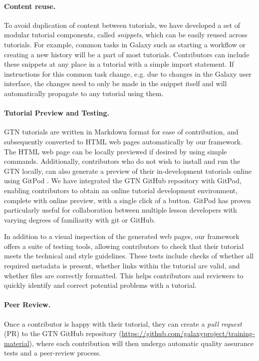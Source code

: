 \paragraph*{Content reuse.}
To avoid duplication of content between tutorials, we have developed a set of modular tutorial components, called \emph{snippets}, which can be easily reused across tutorials.
For example, common tasks in Galaxy such as starting a workflow or creating a new history will be a part of most tutorials. Contributors can include these snippets at any place in a tutorial with a simple import statement. If instructions for this common task change, e.g. due to changes in the Galaxy user interface, the changes need to only be made in the snippet itself and will automatically propagate to any tutorial using them. 

\paragraph*{Tutorial Preview and Testing.}
GTN tutorials are written in Markdown format for ease of contribution, and subsequently converted to HTML web pages automatically by our framework. The HTML web page can be locally previewed if desired by using simple commands. Additionally, contributors who do not wish to install and run the GTN locally, can also generate a preview of their in-development tutorials online using GitPod \cite{gitpod}. 
We have integrated the GTN GitHub repository with GitPod, enabling contributors to obtain an online tutorial development environment, complete with online preview, with a single click of a button. GitPod has proven particularly useful for collaboration between multiple lesson developers with varying degrees of familiarity with git or GitHub.    

In addition to a visual inspection of the generated web pages, our framework offers a suite of testing tools, allowing contributors to check that their tutorial meets the technical and style guidelines.
These tests include checks of whether all required metadata is present, whether links within the tutorial are valid, and whether files are correctly formatted.
This helps contributors and reviewers to quickly identify and correct potential problems with a tutorial.


\paragraph{Peer Review.}
Once a contributor is happy with their tutorial, they can create a \emph{pull request} (PR) to the GTN GitHub repository (\url{https://github.com/galaxyproject/training-material}), where each contribution will then undergo automatic quality assurance tests and a peer-review process.

